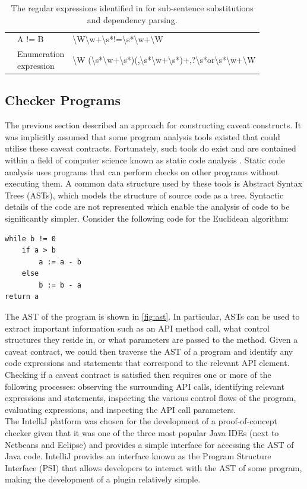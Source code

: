\begin{table}[h]
\begin{tabular}{|l|l|l|}
		& A != B & \textbackslash{}W\textbackslash{}w+\textbackslash{}s*!=\textbackslash{}s*\textbackslash{}w+\textbackslash{}W \\ \cline{2-3} 
		& \shortstack[l]{Enumeration\\ expression} & \textbackslash{}W (\textbackslash{}s*\textbackslash{}w+\textbackslash{}s*)(,\textbackslash{}s*\textbackslash{}w+\textbackslash{}s*)+,?\textbackslash{}s*or\textbackslash{}s*\textbackslash{}w+\textbackslash{}W \\ \hline
	\end{tabular}
	\caption{The regular expressions identified in \cite{zhou-directive} for sub-sentence substitutions and dependency parsing.}
	\label{tab:zhou-regex}
\end{table}

\subsection{Checker Programs}
\label{sec:code-checker}
The previous section described an approach for constructing caveat constructs. It was implicitly assumed that some program analysis tools existed that could utilise these caveat contracts. Fortunately, such tools do exist and are contained within a field of computer science known as static code analysis \cite{1657940}. Static code analysis uses programs that can perform checks on other programs without executing them. A common data structure used by these tools is Abstract Syntax Trees (ASTs), which models the structure of source code as a tree. Syntactic details of the code are not represented which enable the analysis of code to be significantly simpler. Consider the following code for the Euclidean algorithm:

\clearpage

\begin{verbatim}
while b != 0
    if a > b
        a := a - b
    else
        b := b - a
return a
\end{verbatim}

The AST of the program is shown in \ref{fig:ast}. In particular, ASTs can be used to extract important information such as an API method call, what control structures they reside in, or what parameters are passed to the method. Given a caveat contract, we could then traverse the AST of a program and identify any code expressions and statements that correspond to the relevant API element. Checking if a caveat contract is satisfied then requires one or more of the following processes: observing the surrounding API calls, identifying relevant expressions and statements, inspecting the various control flows of the program, evaluating expressions, and inspecting the API call parameters. \\
The IntelliJ platform was chosen for the development of a proof-of-concept checker given that it was one of the three most popular Java IDEs (next to Netbeans and Eclipse) and provides a simple interface for accessing the AST of Java code. IntelliJ provides an interface known as the Program Structure Interface (PSI) that allows developers to interact with the AST of some program, making the development of a plugin relatively simple.

